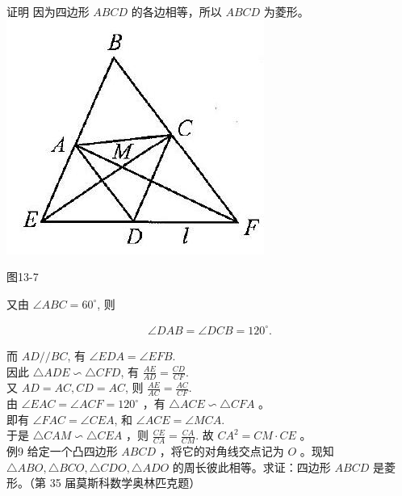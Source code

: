 \documentclass[10pt]{article}
\begin{document}
证明 因为四边形 $A B C D$ 的各边相等，所以 $A B C D$ 为菱形。\\
\includegraphics[max width=\textwidth, center]{2024_10_30_2c8f45efd4a519b08e1ag-124}

图13-7

又由 $\angle A B C=60^{\circ}$, 则

\begin{align*}
\angle D A B=\angle D C B=120^{\circ} .
\end{align*}

而 $A D / / B C$, 有 $\angle E D A=\angle E F B$.\\
因此 $\triangle A D E \backsim \triangle C F D$, 有 $\frac{A E}{A D}=\frac{C D}{C F}$.\\
又 $A D=A C, C D=A C$, 则 $\frac{A E}{A C}=\frac{A C}{C F}$.\\
由 $\angle E A C=\angle A C F=120^{\circ}$ ，有 $\triangle A C E \backsim \triangle C F A$ 。\\
即有 $\angle F A C=\angle C E A$, 和 $\angle A C E=\angle M C A$.\\
于是 $\triangle C A M \backsim \triangle C E A$ ，则 $\frac{C E}{C A}=\frac{C A}{C M}$. 故 $C A^{2}=C M \cdot C E$ 。\\
例9 给定一个凸四边形 $A B C D$ ，将它的对角线交点记为 $O$ 。现知 $\triangle A B O, \triangle B C O, \triangle C D O, \triangle A D O$ 的周长彼此相等。求证：四边形 $A B C D$ 是菱形。（第 35 届莫斯科数学奥林匹克题）
\end{document}
